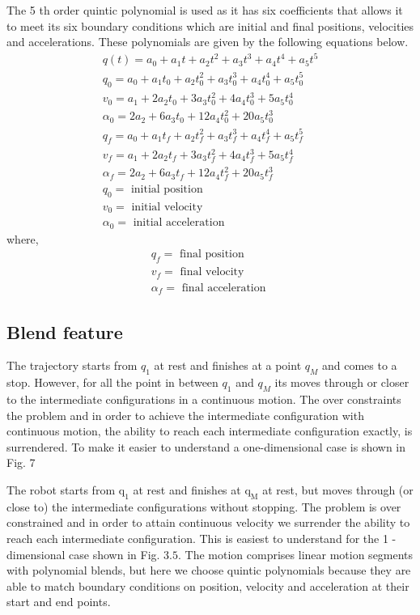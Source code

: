 \documentclass{UoNMCHA}
\numberwithin{equation}{section}
\begin{document}
	
	The 5 th order quintic polynomial is used as it has six coefficients that allows it to meet its six boundary
	conditions which are initial and final positions, velocities and accelerations. These polynomials are
	given by the following equations below.
	$$
	\begin{array}{c}
	q(t)=a_{0}+a_{1} t+a_{2} t^{2}+a_{3} t^{3}+a_{4} t^{4}+a_{5} t^{5} \\
	q_{0}=a_{0}+a_{1} t_{0}+a_{2} t_{0}^{2}+a_{3} t_{0}^{3}+a_{4} t_{0}^{4}+a_{5} t_{0}^{5} \\
	v_{0}=a_{1}+2 a_{2} t_{0}+3 a_{3} t_{0}^{2}+4 a_{4} t_{0}^{3}+5 a_{5} t_{0}^{4} \\
	\alpha_{0}=2 a_{2}+6 a_{3} t_{0}+12 a_{4} t_{0}^{2}+20 a_{5} t_{0}^{3} \\
	q_{f}=a_{0}+a_{1} t_{f}+a_{2} t_{f}^{2}+a_{3} t_{f}^{3}+a_{4} t_{f}^{4}+a_{5} t_{f}^{5} \\
	v_{f}=a_{1}+2 a_{2} t_{f}+3 a_{3} t_{f}^{2}+4 a_{4} t_{f}^{3}+5 a_{5} t_{f}^{4} \\
	\alpha_{f}=2 a_{2}+6 a_{3} t_{f}+12 a_{4} t_{f}^{2}+20 a_{5} t_{f}^{3} \\
	q_{0}=\text { initial position } \\
	v_{0}=\text { initial velocity } \\
	\alpha_{0}=\text { initial acceleration }
	\end{array}
	$$
	where,
	$$
	\begin{array}{l}
	q_{f}=\text { final position } \\
	v_{f}=\text { final velocity } \\
	\alpha_{f}=\text { final acceleration }
	\end{array}
	$$
	\subsection{Blend feature} 
	The trajectory starts from $q_{1}$ at rest and finishes at a point $q_{M}$ and comes to a stop. However, for all the
	point in between $q_{1}$ and $q_{M}$ its moves through or closer to the intermediate configurations in a
	continuous motion. The over constraints the problem and in order to achieve the intermediate
	configuration with continuous motion, the ability to reach each intermediate configuration exactly, is
	surrendered. To make it easier to understand a one-dimensional case is shown in Fig. 7
	
	The robot starts from $\mathrm{q}_{1}$ at rest and finishes at $\mathrm{q}_{\mathrm{M}}$ at rest, but moves through (or close to) the
	intermediate configurations without stopping. The problem is over constrained and in order to attain
	continuous velocity we surrender the ability to reach each intermediate configuration. This is easiest to
	understand for the 1 -dimensional case shown in Fig. $3.5 .$ The motion comprises linear motion segments
	with polynomial blends, but here we choose quintic polynomials because they are able to match
	boundary conditions on position, velocity and acceleration at their start and end points.
	
\end{document}

